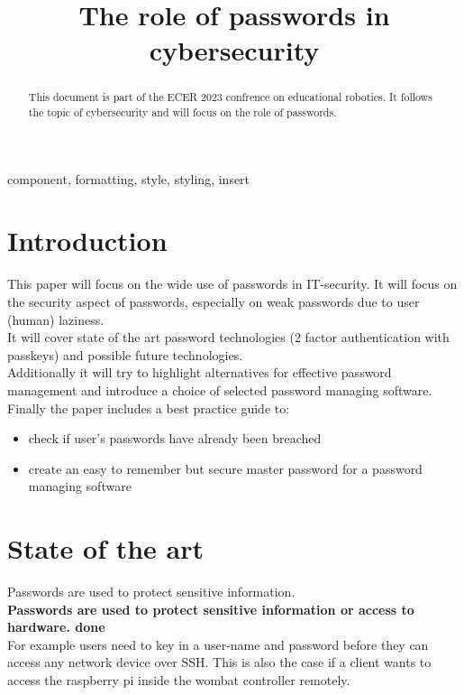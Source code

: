 \documentclass[conference]{IEEEtran}
\begin{document}
\title{The role of passwords in cybersecurity}

\author{
}

\maketitle

\begin{abstract}
This document is part of the ECER 2023 confrence on educational robotics. It follows the topic of cybersecurity and will focus on the role of passwords.
\end{abstract}
\vspace{2cm}
\begin{IEEEkeywords}
component, formatting, style, styling, insert
\end{IEEEkeywords}

\section{Introduction}
This paper will focus on the wide use of passwords in IT-security. It will focus on the security aspect of passwords, especially on weak passwords due to user (human) laziness. \\
It will cover state of the art password technologies (2 factor authentication with passkeys) and possible future technologies.\\
Additionally it will try to highlight alternatives for effective password management and introduce a choice of selected password managing software. \\
Finally the paper includes a best practice guide to:
\begin{itemize}
\item check if user's passwords have already been breached 
\item create an easy to remember but secure master password for a password managing software
\end{itemize} 


\section{State of the art}
Passwords are used to protect sensitive information.\\
\textbf{Passwords are used to protect sensitive information or access to hardware. done}\\
 For example users need to key in a user-name and password before they can access any network device over SSH. This is also the case if a client wants to access the raspberry pi inside the wombat controller remotely. 
\end{document}
